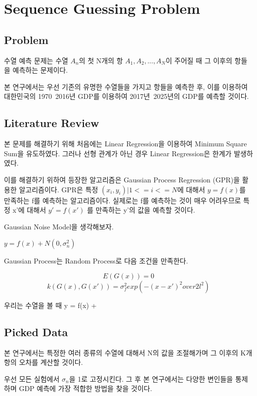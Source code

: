 \documentclass{sig-alternate-05-2015}
\begin{document}
\section{Sequence Guessing Problem}
\begin{CJK}{UTF8}{mj}
\subsection{Problem}
수열 예측 문제는 수열 ${A_n}$의 첫 N개의 항 $A_1, A_2, ..., A_N$이 주어질 때 그 이후의 항들을 예측하는 문제이다.

본 연구에서는 우선 기존의 유명한 수열들을 가지고 항들을 예측한 후, 이를 이용하여 대한민국의 1970~2016년 GDP를 이용하여 2017년~2025년의 GDP를 예측할 것이다.

\subsection{Literature Review}
본 문제를 해결하기 위해 처음에는 Linear Regression을 이용하여 Minimum Square Sum을 유도하였다. 그러나 선형 관계가 아닌 경우 Linear Regression은 한계가 발생하였다.

이를 해결하기 위하여 등장한 알고리즘은 Gaussian Process Regression (GPR)을 활용한 알고리즘이다.
GPR은 특정 ${(x_i,y_i) | 1<=i<=N}$에 대해서 $y = f(x)$를 만족하는 f를 예측하는 알고리즘이다. 실제로는 f를 예측하는 것이 매우 어려우므로 특정 x'에 대해서 $y' = f(x')$ 를 만족하는 y'의 값을 예측할 것이다.

Gaussian Noise Model을 생각해보자.

$y = f(x) + N(0, \sigma_n^2)$

Gaussian Process는 Random Process로 다음 조건을 만족한다.

\begin{equation} E(G(x)) = 0 \end{equation}
\begin{equation} k(G(x),G(x')) = \sigma_f^2 exp({-(x-x')^2} over {2l^2}) \end{equation}

우리는 수열을 볼 때 y = f(x) + 

\subsection{Picked Data}
본 연구에서는 특정한 여러 종류의 수열에 대해서 N의 값을 조절해가며 그 이후의 K개 항의 오차를 계산할 것이다.

우선 모든 실험에서 $\sigma_n$을 1로 고정시킨다. 그 후 본 연구에서는 다양한 변인들을 통제하며 GDP 예측에 가장 적합한 방법을 찾을 것이다.


\end{CJK}
\end{document}
